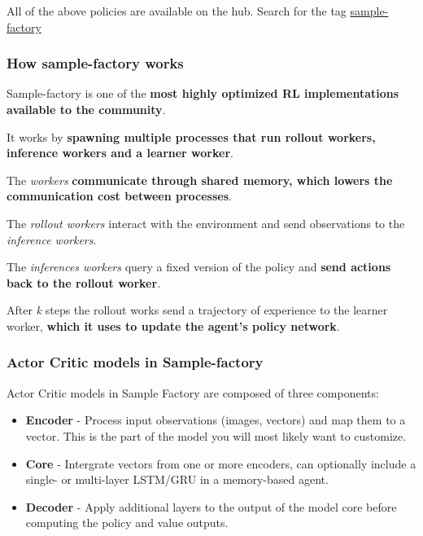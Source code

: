 \documentclass[11pt,a4paper]{article}
\begin{document}
All of the above policies are available on the hub. Search for the tag \href{https://huggingface.co/models?library=sample-factory&sort=downloads}{sample-factory}

\subsubsection{How sample-factory works}\label{how-sample-factory-works}

Sample-factory is one of the \textbf{most highly optimized RL implementations available to the community}.

It works by \textbf{spawning multiple processes that run rollout workers, inference workers and a learner worker}.

The \emph{workers} \textbf{communicate through shared memory, which lowers the communication cost between processes}.

The \emph{rollout workers} interact with the environment and send observations to the \emph{inference workers}.

The \emph{inferences workers} query a fixed version of the policy and \textbf{send actions back to the rollout worker}.

After \emph{k} steps the rollout works send a trajectory of experience to the learner worker, \textbf{which it uses to update the agent's policy network}.


\subsubsection{Actor Critic models in Sample-factory}\label{actor-critic-models-in-sample-factory}

Actor Critic models in Sample Factory are composed of three components:

\begin{itemize}
\tightlist
\item
  \textbf{Encoder} - Process input observations (images, vectors) and map them to a vector. This is the part of the model you will most likely want to customize.
\item
  \textbf{Core} - Intergrate vectors from one or more encoders, can optionally include a single- or multi-layer LSTM/GRU in a memory-based agent.
\item
  \textbf{Decoder} - Apply additional layers to the output of the model core before computing the policy and value outputs.
\end{itemize}
\end{document}
